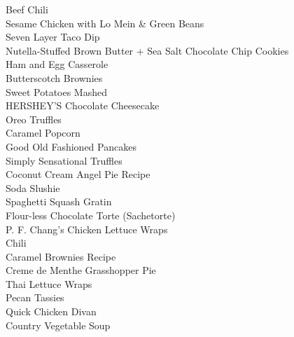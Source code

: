 \documentclass[11pt, twoside, openany]{book}
\begin{document}
Beef Chili\hrulefill\pageref{beef-chili}\\
Sesame Chicken with Lo Mein & Green Beans\hrulefill\pageref{sesame-chicken-with-lo-mein-&-green-beans}\\
Seven Layer Taco Dip\hrulefill\pageref{seven-layer-taco-dip}\\
Nutella-Stuffed Brown Butter + Sea Salt Chocolate Chip Cookies\hrulefill\pageref{nutella-stuffed-brown-butter-+-sea-salt-chocolate-chip-cookies}\\
Ham and Egg Casserole\hrulefill\pageref{ham-and-egg-casserole}\\
Butterscotch Brownies\hrulefill\pageref{butterscotch-brownies}\\
Sweet Potatoes Mashed\hrulefill\pageref{sweet-potatoes-mashed}\\
HERSHEY'S Chocolate Cheesecake\hrulefill\pageref{hershey's-chocolate-cheesecake}\\
Oreo Truffles\hrulefill\pageref{oreo-truffles}\\
Caramel Popcorn\hrulefill\pageref{caramel-popcorn}\\
Good Old Fashioned Pancakes\hrulefill\pageref{good-old-fashioned-pancakes}\\
Simply Sensational Truffles\hrulefill\pageref{simply-sensational-truffles}\\
Coconut Cream Angel Pie Recipe\hrulefill\pageref{coconut-cream-angel-pie-recipe}\\
Soda Slushie\hrulefill\pageref{soda-slushie}\\
Spaghetti Squash Gratin\hrulefill\pageref{spaghetti-squash-gratin}\\
Flour-less Chocolate Torte (Sachetorte)\hrulefill\pageref{flour-less-chocolate-torte-(sachetorte)}\\
P. F. Chang's Chicken Lettuce Wraps\hrulefill\pageref{p.-f.-chang's-chicken-lettuce-wraps}\\
Chili\hrulefill\pageref{chili}\\
Caramel Brownies Recipe\hrulefill\pageref{caramel-brownies-recipe}\\
Creme de Menthe Grasshopper Pie\hrulefill\pageref{creme-de-menthe-grasshopper-pie}\\
Thai Lettuce Wraps\hrulefill\pageref{thai-lettuce-wraps}\\
Pecan Tassies\hrulefill\pageref{pecan-tassies}\\
Quick Chicken Divan\hrulefill\pageref{quick-chicken-divan}\\
Country Vegetable Soup\hrulefill\pageref{country-vegetable-soup}\\
\end{document}
